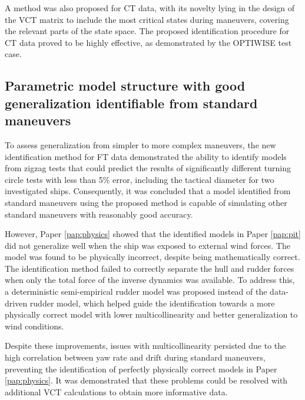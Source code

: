 A method was also proposed for CT data, with its novelty lying in the design of the VCT matrix to include the most critical states during maneuvers, covering the relevant parts of the state space. The proposed identification procedure for CT data proved to be highly effective, as demonstrated by the OPTIWISE test case.

\subsection*{Parametric model structure with good generalization identifiable from standard maneuvers}
To assess generalization from simpler to more complex maneuvers, the new identification method for FT data demonstrated the ability to identify models from zigzag tests that could predict the results of significantly different turning circle tests with less than 5\% error, including the tactical diameter for two investigated ships. Consequently, it was concluded that a model identified from standard maneuvers using the proposed method is capable of simulating other standard maneuvers with reasonably good accuracy.

However, Paper \ref{pap:physics} showed that the identified models in Paper \ref{pap:pit} did not generalize well when the ship was exposed to external wind forces. The model was found to be physically incorrect, despite being mathematically correct. The identification method failed to correctly separate the hull and rudder forces when only the total force of the inverse dynamics was available. To address this, a deterministic semi-empirical rudder model was proposed instead of the data-driven rudder model, which helped guide the identification towards a more physically correct model with lower multicollinearity and better generalization to wind conditions.

Despite these improvements, issues with multicollinearity persisted due to the high correlation between yaw rate and drift during standard maneuvers, preventing the identification of perfectly physically correct models in Paper \ref{pap:physics}. It was demonstrated that these problems could be resolved with additional VCT calculations to obtain more informative data.

